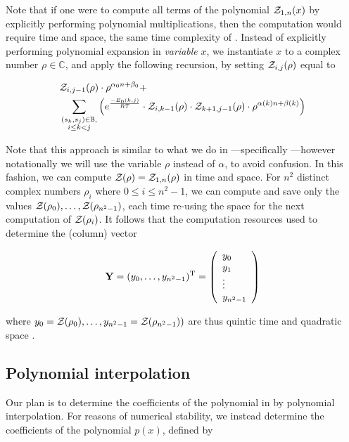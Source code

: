 \documentclass[11pt, oneside]{Thesis} %
\providecommand{\DIFaddbegin}{} %
\providecommand{\DIFaddend}{} %
\begin{document}
Note that if one were to compute all terms of the polynomial ${\mathcal Z}_{1,n}(x)$
by explicitly performing polynomial multiplications,
then the computation would require  time and  space, the
same time complexity of \rnatwofold \citep{hofacker:RNAbor2D}.
Instead of explicitly performing polynomial expansion in {\em variable} $x$,
we instantiate $x$ to a
complex number $\rho \in \mathbb{C}$, and apply
the following recursion, by setting ${\mathcal Z}_{i,j}(\rho)$ equal to

\begin{align}
\label{eq:ffttwo:polyRecNussJacInit}
\begin{split}
&\emZof{i,j-1}{\rho} \cdot \rho^{\alpha_0n+\beta_0} + \\
&\sum_{\substack{(s_k,s_j) \in \bpSet,\\i\le k<j}}
\left(\boltzNuss{k,j}\cdot
\emZof{i,k-1}{\rho} \cdot \emZof{k+1,j-1}{\rho}
\cdot \rho^{\alpha(k)n+\beta(k)} \right)
\end{split}
\end{align}

Note that this approach is similar to what we do in \fftbor---specifically
---however notationally we will use the
variable $\rho$ instead of $\alpha$, to avoid confusion. In this fashion, we
can compute ${\mathcal Z}_{}(\rho)={\mathcal Z}_{1,n}(\rho)$ in
 time and  space. For $n^2$ distinct complex numbers
$\rho_i$ where $0 \leq i \leq n^2-1$, we can compute and save only the
values ${\mathcal Z}_{}(\rho_0),\dots,{\mathcal Z}_{}(\rho_{n^2-1})$, each time re-using the
 space for the next computation of ${\mathcal Z}_{}(\rho_i)$.
It follows that
the computation resources used to determine the (column) vector
\DIFaddbegin 

\DIFaddend \begin{align}
\label{eq:ffttwo:yColumn}
\bfY = (y_0,\dots,y_{n^2-1})^{\text T} =
\left(
\begin{array}{l}
y_0 \\
y_1 \\
\vdots \\
y_{n^2-1} \\
\end{array}
\right)
\end{align}

where $y_0={\mathcal Z}_{}(\rho_0),\dots,y_{n^2-1}={\mathcal Z}_{}(\rho_{n^2-1}))$ are thus
quintic time  and quadratic space .

\subsection{Polynomial interpolation}
Our plan is to determine the coefficients of the polynomial
\fullZx in  by
polynomial interpolation.  For reasons of numerical stability,
we instead determine the coefficients of the polynomial $p(x)$,
defined by
\end{document}
